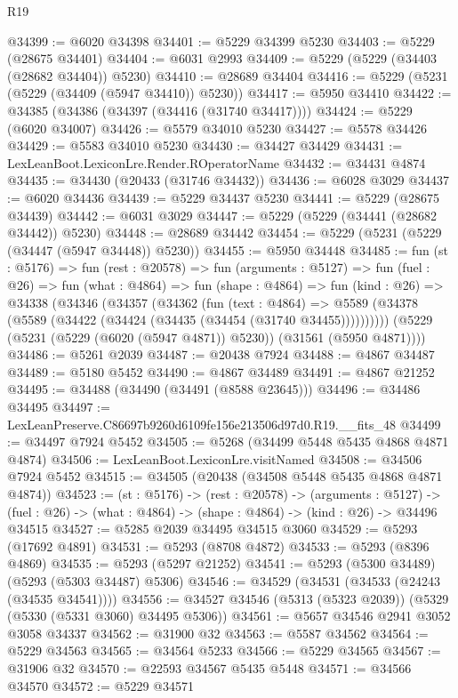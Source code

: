 \begin{lexlean}{R19}
\begin{coremodule}
@34399 := @6020 @34398
@34401 := @5229 @34399 @5230
@34403 := @5229 (@28675 @34401)
@34404 := @6031 @2993
@34409 := @5229 (@5229 (@34403 (@28682 @34404)) @5230)
@34410 := @28689 @34404
@34416 := @5229 (@5231 (@5229 (@34409 (@5947 @34410)) @5230))
@34417 := @5950 @34410
@34422 := @34385 (@34386 (@34397 (@34416 (@31740 @34417))))
@34424 := @5229 (@6020 @34007)
@34426 := @5579 @34010 @5230
@34427 := @5578 @34426
@34429 := @5583 @34010 @5230
@34430 := @34427 @34429
@34431 := LexLeanBoot.LexiconLre.Render.ROperatorName
@34432 := @34431 @4874
@34435 := @34430 (@20433 (@31746 @34432))
@34436 := @6028 @3029
@34437 := @6020 @34436
@34439 := @5229 @34437 @5230
@34441 := @5229 (@28675 @34439)
@34442 := @6031 @3029
@34447 := @5229 (@5229 (@34441 (@28682 @34442)) @5230)
@34448 := @28689 @34442
@34454 := @5229 (@5231 (@5229 (@34447 (@5947 @34448)) @5230))
@34455 := @5950 @34448
@34485 := fun (st : @5176) =>
  fun (rest : @20578) =>
  fun (arguments : @5127) =>
  fun (fuel : @26) =>
  fun (what : @4864) =>
  fun (shape : @4864) =>
  fun (kind : @26) =>
  @34338
    (@34346
      (@34357
        (@34362
          (fun (text : @4864) =>
          @5589 (@34378 (@5589 (@34422 (@34424 (@34435 (@34454 (@31740 @34455))))))))))
      (@5229 (@5231 (@5229 (@6020 (@5947 @4871)) @5230)) (@31561 (@5950 @4871))))
@34486 := @5261 @2039
@34487 := @20438 @7924
@34488 := @4867 @34487
@34489 := @5180 @5452
@34490 := @4867 @34489
@34491 := @4867 @21252
@34495 := @34488 (@34490 (@34491 (@8588 @23645)))
@34496 := @34486 @34495
@34497 := LexLeanPreserve.C86697b9260d6109fe156e213506d97d0.R19.__fits_48
@34499 := @34497 @7924 @5452
@34505 := @5268 (@34499 @5448 @5435 @4868 @4871 @4874)
@34506 := LexLeanBoot.LexiconLre.visitNamed
@34508 := @34506 @7924 @5452
@34515 := @34505 (@20438 (@34508 @5448 @5435 @4868 @4871 @4874))
@34523 := (st : @5176) ->
  (rest : @20578) ->
  (arguments : @5127) ->
  (fuel : @26) -> (what : @4864) -> (shape : @4864) -> (kind : @26) -> @34496 @34515
@34527 := @5285 @2039 @34495 @34515 @3060
@34529 := @5293 (@17692 @4891)
@34531 := @5293 (@8708 @4872)
@34533 := @5293 (@8396 @4869)
@34535 := @5293 (@5297 @21252)
@34541 := @5293 (@5300 @34489) (@5293 (@5303 @34487) @5306)
@34546 := @34529 (@34531 (@34533 (@24243 (@34535 @34541))))
@34556 := @34527 @34546 (@5313 (@5323 @2039)) (@5329 (@5330 (@5331 @3060) @34495 @5306))
@34561 := @5657 @34546 @2941 @3052 @3058 @34337
@34562 := @31900 @32
@34563 := @5587 @34562
@34564 := @5229 @34563
@34565 := @34564 @5233
@34566 := @5229 @34565
@34567 := @31906 @32
@34570 := @22593 @34567 @5435 @5448
@34571 := @34566 @34570
@34572 := @5229 @34571

\end{coremodule}
\end{lexlean}
